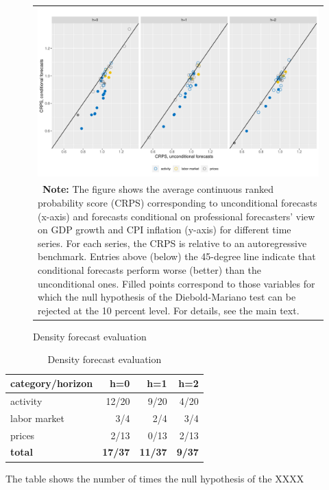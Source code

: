 \documentclass[notitlepage,a4paper,12pt]{article}
\begin{document}
\begin{figure}[htp!] \centering
    \caption{Density forecast evaluation \label{fig:crps}}
    \footnotesize
    \begin{tabular}{p{16cm}}
        \multicolumn{1}{c}{\includegraphics*[scale = 0.6]{../figures/fig_eval_crps.pdf}} \\
        {
        \footnotesize \textbf{Note:} The figure shows the average continuous ranked probability score (CRPS)  corresponding to unconditional forecasts (x-axis) and forecasts conditional on professional forecasters' view on GDP growth and CPI inflation (y-axis) for different time series. For each series, the CRPS is relative to an autoregressive benchmark. Entries above (below) the 45-degree line indicate that conditional forecasts perform worse (better) than the unconditional ones. Filled points correspond to those variables for which the null hypothesis of the Diebold-Mariano test can be rejected at the 10 percent level. For details, see the main text. 
        }
        \end{tabular}
    \newline
    \normalsize
\end{figure}

\begin{table}[htb!]
    \centering
    \begin{threeparttable}
        \caption{Density forecast evaluation}
        \label{table:dm_crps}
        \begin{tabular}{lrrr}
        \toprule
        category/horizon & h=0 & h=1 & h=2 \\ 
        \midrule
        activity & 12/20 & 9/20 & 4/20 \\ 
        labor market & 3/4 & 2/4 & 3/4 \\ 
        prices & 2/13 & 0/13 & 2/13 \\ 
        \textbf{total} & \textbf{17/37} & \textbf{11/37} & \textbf{9/37} \\
        \bottomrule
        \end{tabular}
        \begin{tablenotes}
            \scriptsize
            \item The table shows the number of times the null hypothesis of the XXXX
        \end{tablenotes}
    \end{threeparttable}
\end{table}
\end{document}
